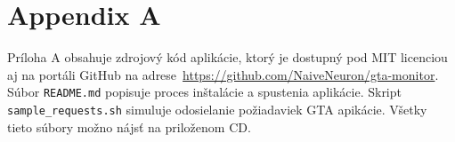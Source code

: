 \chapter*{Appendix A}

Príloha A obsahuje zdrojový kód aplikácie, ktorý je dostupný pod MIT licenciou aj na
portáli GitHub na adrese~\url{https://github.com/NaiveNeuron/gta-monitor}.
Súbor \verb'README.md' popisuje proces inštalácie a spustenia aplikácie. Skript
\verb'sample_requests.sh' simuluje odosielanie požiadaviek GTA apikácie.
Všetky tieto súbory možno nájsť na priloženom CD.